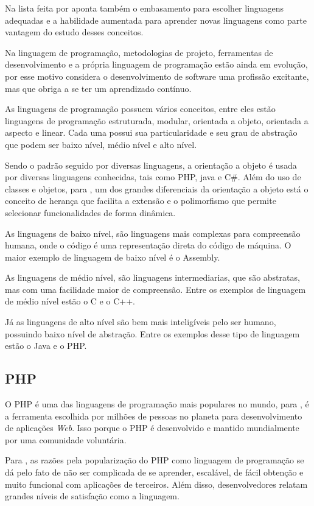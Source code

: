 Na lista feita por \citet{sebesta2011} aponta também o embasamento para escolher linguagens adequadas e a habilidade aumentada para aprender novas linguagens como parte vantagem do estudo desses conceitos.

Na linguagem de programação, metodologias de projeto, ferramentas de desenvolvimento e a própria linguagem de programação estão ainda em evolução, por esse motivo \citet{sebesta2011} considera o desenvolvimento de software uma profissão excitante, mas que obriga a se ter um aprendizado contínuo.

As linguagens de programação possuem vários conceitos, entre eles estão linguagens de programação estruturada, modular, orientada a objeto, orientada a aspecto e linear. Cada uma possui sua particularidade e seu grau de abstração que podem ser baixo nível, médio nível e alto nível.

Sendo o padrão seguido por diversas linguagens, a orientação a objeto é usada por diversas linguagens conhecidas, tais como PHP, java e C\#. Além do uso de classes e objetos, para \citet{ricarte2001}, um dos grandes diferenciais da orientação a objeto está o conceito de herança que facilita a extensão e o polimorfismo que permite selecionar funcionalidades de forma dinâmica.

As linguagens de baixo nível, são linguagens mais complexas para compreensão humana, onde o código é uma representação direta do código de máquina. O maior exemplo de linguagem de baixo nível é o Assembly.

As linguagens de médio nível, são linguagens intermediarias, que são abstratas, mas com uma facilidade maior de compreensão. Entre os exemplos de linguagem de médio nível estão o C e o C++.

Já as linguagens de alto nível são bem mais inteligíveis pelo ser humano, possuindo baixo nível de abstração. Entre os exemplos desse tipo de linguagem estão o Java e o PHP.

\subsection{PHP}
O PHP é uma das linguagens de programação mais populares no mundo, para \citet[p.2]{vaswani2010}, é a ferramenta  escolhida por milhões de pessoas no planeta para desenvolvimento de aplicações \textit{Web}. Isso porque o PHP é desenvolvido e mantido mundialmente por uma comunidade voluntária. 

Para \citet[p.2]{vaswani2010}, as razões pela popularização do PHP como linguagem de programação se dá pelo fato de não ser complicada de se aprender, escalável, de fácil obtenção e muito funcional com aplicações de terceiros. Além disso, desenvolvedores relatam grandes níveis de satisfação como a linguagem.

